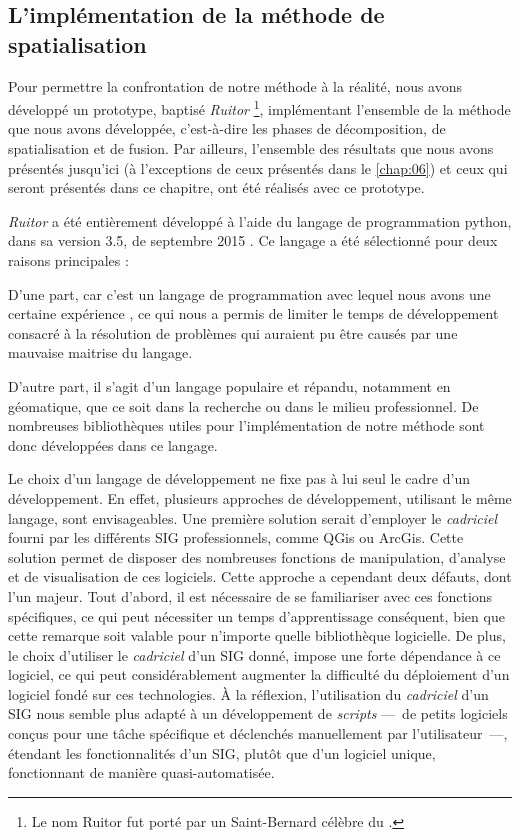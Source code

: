 \subsection{L'implémentation de la méthode de spatialisation}

Pour permettre la confrontation de notre méthode à la réalité, nous
avons développé un prototype, baptisé \emph{Ruitor} \footnote{Le nom
  Ruitor fut porté par un Saint-Bernard célèbre du
  .}, implémentant l'ensemble de la méthode que nous
avons développée, c'est-à-dire les phases de décomposition, de
spatialisation et de fusion. Par ailleurs, l'ensemble des résultats
que nous avons présentés jusqu'ici (à l'exceptions de ceux présentés
dans le \autoref{chap:06}) et ceux qui seront présentés dans ce
chapitre, ont été réalisés avec ce prototype.

\emph{Ruitor} a été entièrement développé à l'aide du langage de
programmation python, dans sa version 3.5, de septembre 2015
\autocite{VanRossum2009}. Ce langage a été sélectionné pour deux
raisons principales :
%
\begin{enumerate*}[label=(\arabic*)]
\item D'une part, car c'est un langage de programmation avec lequel
  nous avons une certaine expérience \autocite{Bunel2017b,Bunel2017c},
  ce qui nous a permis de limiter le temps de développement consacré à
  la résolution de problèmes qui auraient pu être causés par une
  mauvaise maitrise du langage.
\item D'autre part, il s'agit d'un langage populaire et répandu,
  notamment en géomatique, que ce soit dans la recherche ou dans le
  milieu professionnel. De nombreuses bibliothèques utiles pour
  l'implémentation de notre méthode sont donc développées dans ce
  langage.
\end{enumerate*}
%
Le choix d'un langage de développement ne fixe pas à lui seul le cadre
d'un développement. En effet, plusieurs approches de développement,
utilisant le même langage, sont envisageables. Une première solution
serait d'employer le \emph{cadriciel} fourni par les différents SIG
professionnels, comme QGis ou ArcGis. Cette solution permet de
disposer des nombreuses fonctions de manipulation, d'analyse et de
visualisation de ces logiciels. Cette approche a cependant deux
défauts, dont l'un majeur. Tout d'abord, il est nécessaire de se
familiariser avec ces fonctions spécifiques, ce qui peut nécessiter un
temps d’apprentissage conséquent, bien que cette remarque soit valable
pour n'importe quelle bibliothèque logicielle. De plus, le choix
d'utiliser le \emph{cadriciel} d'un SIG donné, impose une forte
dépendance à ce logiciel, ce qui peut considérablement augmenter la
difficulté du déploiement d'un logiciel fondé sur ces technologies. À
la réflexion, l'utilisation du \emph{cadriciel} d'un SIG nous semble
plus adapté à un développement de \emph{scripts} ---~de petits
logiciels conçus pour une tâche spécifique et déclenchés manuellement
par l'utilisateur~---, étendant les fonctionnalités d'un SIG, plutôt
que d'un logiciel unique, fonctionnant de manière quasi-automatisée.

